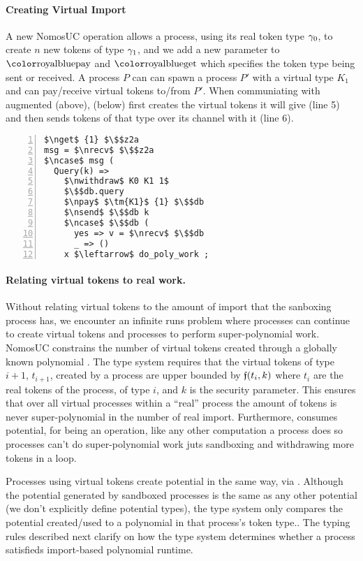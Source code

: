 \paragraph{Creating Virtual Import}
A new NomosUC operation  allows a process, using its real token type $\gamma_0$, to create $n$ new tokens of type $\gamma_1$, and we add a new parameter to $\npay$ and $\nget$ which specifies the token type being sent or received. 
A process $P$ can can spawn a process $P'$ with a virtual type $K_1$ and can pay/receive virtual tokens to/from $P'$.
When communiating with augmented \Fdb (above), \Sim (below) first creates the virtual tokens it will give \Fdb (line 5) and then sends tokens of that type over its channel with it (line 6).
\begin{lstlisting}[basicstyle=\scriptsize\BeraMonottFamily, frame=single, mathescape, numbers=left, xleftmargin=2em, xrightmargin=2em]
$\nget$ {1} $\$$z2a
msg = $\nrecv$ $\$$z2a
$\ncase$ msg (
  Query(k) => 
    $\nwithdraw$ K0 K1 1$
    $\$$db.query
    $\npay$ $\tm{K1}$ {1} $\$$db
    $\nsend$ $\$$db k
    $\ncase$ $\$$db (
      yes => v = $\nrecv$ $\$$db 
      _ => ()
    x $\leftarrow$ do_poly_work ;
\end{lstlisting}

\paragraph{Relating virtual tokens to real work.}
Without relating virtual tokens to the amount of import that the sanboxing process has, we encounter an infinite runs problem where processes can continue to create virtual tokens and processes to perform super-polynomial work.
NomosUC constrains the number of virtual tokens created through a globally known polynomial \GlobalF.
The type system requires that the virtual tokens of type $i+1$, $t_{i+1}$, created by a process are upper bounded by $\mathfrak{f}(t_i, k)$ where $t_i$ are the real tokens of the process, of type $i$, and $k$ is the security parameter. 
This ensures that over all virtual processes within a ``real'' process the amount of tokens is never super-polynomial in the number of real import.
Furthermore, \inline{$\nwithdraw$} consumes potential, for being an operation, like any other computation a process does so processes can't do super-polynomial work juts sandboxing and withdrawing more tokens in a loop.

Processes using virtual tokens create potential in the same way, via \inline{$\ngenpot$}. 
Although the potential generated by sandboxed processes is the same as any other potential (we don't explicitly define potential types), the type system only compares the potential created/used to a polynomial in that process's token type.. 
The typing rules described next clarify on how the type system determines whether a process satisfieds import-based polynomial runtime.

